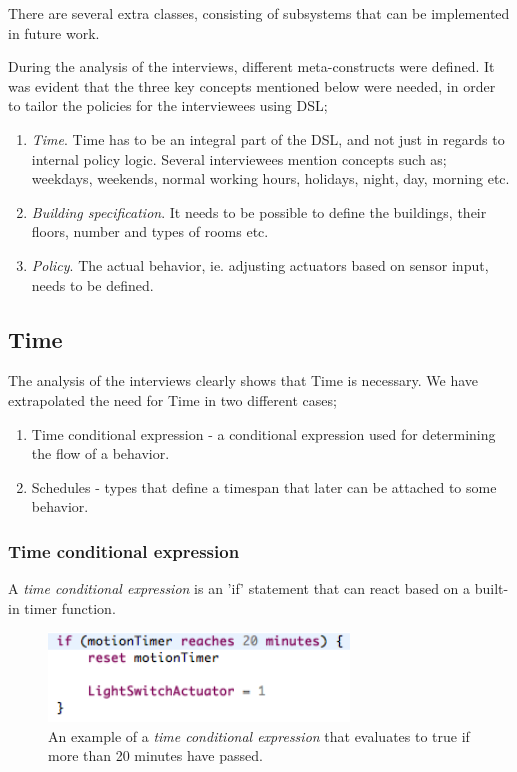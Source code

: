 \documentclass{llncs}
\begin{document}
\pagebreak
There are several extra classes, consisting of subsystems that can be implemented in future work.

During the analysis of the interviews, different meta-constructs were defined. It was evident that the three key concepts mentioned below were needed, in order to tailor the policies for the interviewees using DSL;

\begin{enumerate}
	\item \textit{Time}. Time has to be an integral part of the DSL, and not just in regards to internal policy logic. Several interviewees mention concepts such as; weekdays, weekends, normal working hours, holidays, night, day, morning etc.
	
	\item \textit{Building specification}. It needs to be possible to define the buildings, their floors, number and types of rooms etc.

	\item \textit{Policy}. The actual behavior, ie. adjusting actuators based on sensor input, needs to be defined. 
\end{enumerate}

\subsection{Time}\label{subsec:time}
The analysis of the interviews clearly shows that Time is necessary. We have extrapolated the need for Time in two different cases;
	\begin{enumerate}
		\item Time conditional expression - a conditional expression used for determining the flow of a behavior.
		\item Schedules - types that define a timespan that later can be attached to some behavior.
	\end{enumerate}

\subsubsection{Time conditional expression}\label{subsubsec:conditionalexpression}
A \textit{time conditional expression} is an 'if' statement that can react based on a built-in timer function. 

\begin{figure}
  \centering
    \includegraphics[width=8cm]{dsl-conditional-time-expression.png} 
	\caption{An example of a \textit{time conditional expression} that evaluates to true if more than 20 minutes have passed.}
	\label{fig:dsl-conditionalexpression}
\end{figure}
\end{document}
